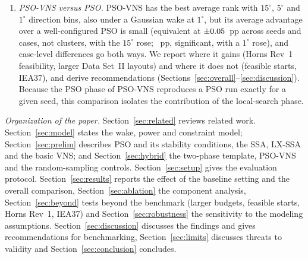 \begin{enumerate}
\item \emph{PSO-VNS versus PSO.} PSO-VNS has the best average rank with $15^\circ$, $5^\circ$ and $1^\circ$ direction bins, also under a Gaussian wake at $1^\circ$, but its average advantage over a well-configured PSO is small (equivalent at $\pm0.05$~pp across seeds and cases, not clusters, with the $15^\circ$ rose; \NFPairMeanOne~pp, significant, with a $1^\circ$ rose), and case-level differences go both ways. We report where it gains (Horns Rev~1 feasibility, larger Data Set~II layouts) and where it does not (feasible starts, IEA37), and derive recommendations (Sections~\ref{sec:overall}--\ref{sec:discussion}). Because the PSO phase of PSO-VNS reproduces a PSO run exactly for a given seed, this comparison isolates the contribution of the local-search phase.
\end{enumerate}

\emph{Organization of the paper.} Section~\ref{sec:related} reviews related work. Section~\ref{sec:model} states the wake, power and constraint model; Section~\ref{sec:prelim} describes PSO and its stability conditions, the SSA, LX-SSA and the basic VNS; and Section~\ref{sec:hybrid} the two-phase template, PSO-VNS and the random-sampling controls. Section~\ref{sec:setup} gives the evaluation protocol. Section~\ref{sec:results} reports the effect of the baseline setting and the overall comparison, Section~\ref{sec:ablation} the component analysis, Section~\ref{sec:beyond} tests beyond the benchmark (larger budgets, feasible starts, Horns Rev~1, IEA37) and Section~\ref{sec:robustness} the sensitivity to the modeling assumptions. Section~\ref{sec:discussion} discusses the findings and gives recommendations for benchmarking, Section~\ref{sec:limits} discusses threats to validity and Section~\ref{sec:conclusion} concludes.
